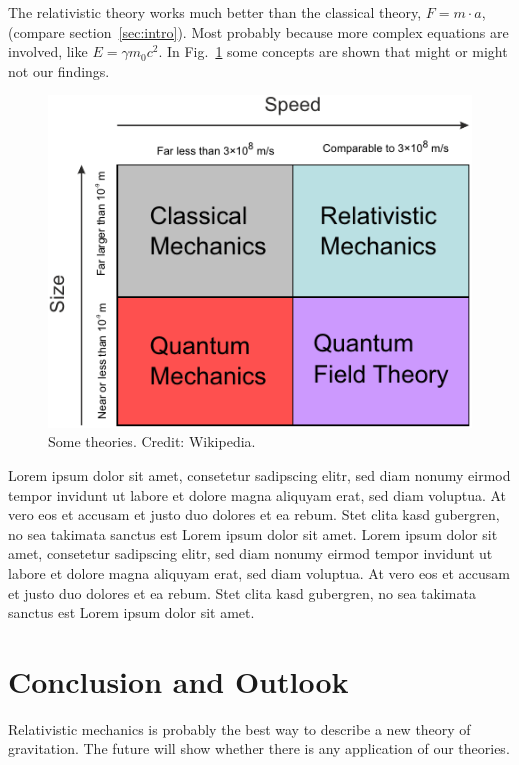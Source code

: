 \documentclass[a4paper,]{article}
\begin{document}
The relativistic theory works much better than the classical theory, \(F=m\cdot a\), (compare section~\ref{sec:intro}). Most probably because more complex equations are involved, like \(E=\gamma m_0c^2\).
In Fig.~\ref{fig:theories} some concepts are shown that might or might not our findings.

\begin{figure}
\hypertarget{fig:theories}{%
\centering
\includegraphics{../fig/theories.pdf}
\caption{Some theories. Credit: Wikipedia.}\label{fig:theories}
}
\end{figure}

Lorem ipsum dolor sit amet, consetetur sadipscing elitr, sed diam nonumy eirmod tempor invidunt ut labore et dolore magna aliquyam erat, sed diam voluptua. At vero eos et accusam et justo duo dolores et ea rebum. Stet clita kasd gubergren, no sea takimata sanctus est Lorem ipsum dolor sit amet. Lorem ipsum dolor sit amet, consetetur sadipscing elitr, sed diam nonumy eirmod tempor invidunt ut labore et dolore magna aliquyam erat, sed diam voluptua. At vero eos et accusam et justo duo dolores et ea rebum. Stet clita kasd gubergren, no sea takimata sanctus est Lorem ipsum dolor sit amet.

\hypertarget{conclusion-and-outlook}{%
\section{Conclusion and Outlook}\label{conclusion-and-outlook}}

Relativistic mechanics is probably the best way to describe a new theory of gravitation.
The future will show whether there is any application of our theories.
\end{document}
